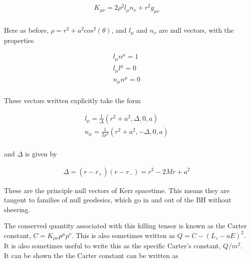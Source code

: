 \documentclass[11pt,table]{article}
\begin{document}
\begin{equation}
    \begin{aligned}
    K_{\mu\nu} = 2\rho^2 l_\mu n_\nu + r^2 g_{\mu\nu}\\
    \end{aligned}
    \label{eq:KerrKT}
\end{equation}

Here as before, $\rho = r^2 + a^2 cos^2(\theta)$, and $l_\mu$ and $n_\nu$ are null vectors, with the properties

\begin{equation}
    \begin{aligned}
    l_\mu n^\mu = 1\\
    l_\mu l^\mu = 0\\
    n_\mu n^\mu = 0\\
    \end{aligned}
    \label{eq:nullVec}
\end{equation}

These vectors written explicitly take the form

\begin{equation}
    \begin{aligned}
    l_\mu = \frac{1}{\Delta}(r^2+a^2, \Delta, 0, a)\\
    n_\mu = \frac{1}{2\rho^2}(r^2+a^2, -\Delta, 0, a)\\
    \end{aligned}
    \label{eq:landn}
\end{equation}

and $\Delta$ is given by

\begin{equation}
    \begin{aligned}
    \Delta = (r-r_+)(r-r_-) = r^2-2Mr+a^2
    \end{aligned}
    \label{eq:delta}
\end{equation}

These are the principle null vectors of Kerr spacetime. This means they are tangent to families of null geodesics, which go in and out of the BH without sheering.

The conserved quantity associated with this killing tensor is known as the Carter constant, $C = K_{\mu\nu}p^\mu p^\nu$. This is also sometimes written as $Q = C - (L_z - aE)^2$. It is also sometimes useful to write this as the specific Carter's constant, $Q/m^2$. \\

It can be shown the the Carter constant can be written as 
\end{document}
